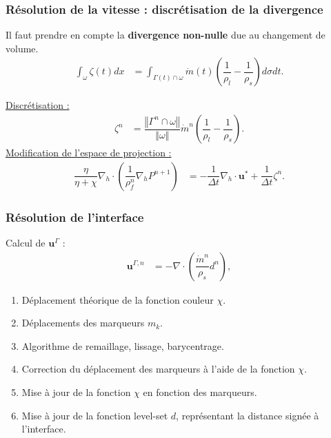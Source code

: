 \documentclass{beamer}
\newcommand{\inte}{\Gamma}
\newcommand{\vect}[1]{\bm{#1}}
\newcommand{\npl}{{n+1}}
\newcommand{\normeVec}[1]{\left\Vert #1\right\Vert}
\renewcommand{\frac}{\dfrac}
\begin{document}
\begin{frame}
    \frametitle{Résolution de la vitesse : discrétisation de la divergence}
    \footnotesize
        Il faut prendre en compte la \textbf{divergence non-nulle} due au changement de volume.\\
\begin{align}
	 \int_\omega \zeta (t) dx &= \int_{\inte (t) \cap \omega} \Dot{m}(t) \left( \frac{1}{\rho_l} - \frac{1}{\rho_s} \right) d\sigma dt.
\end{align}

\color{cea_rouge}\underline{Discrétisation :}\color{cea_texte}
\begin{align}
	\zeta^n &= \frac{\normeVec{\inte^n \cap \omega}}{\normeVec{\omega}}\Dot{m}^n \left( \frac{1}{\rho_l} - \frac{1}{\rho_s} \right).
\end{align}
\color{cea_rouge}\underline{Modification de l'espace de projection :}\color{cea_texte}
\begin{align}
	\label{eq:pression3}
	\frac{\eta}{\eta + \chi} \nabla_h \cdot \left( \frac{1}{\rho^n_f} \nabla_h P^\npl \right) &= -\frac{1}{\Delta t} \nabla_h \cdot \vect{u}^* + \frac{1}{\Delta t} \zeta^n.
\end{align}
\vspace{0.3cm}

\begin{center}
		\begin{tikzpicture}[scale = 0.55, every node/.style={scale=0.55}]
			
		\end{tikzpicture}
\end{center}
\end{frame}

\begin{frame}
    \frametitle{Résolution de l'interface}
    \footnotesize
Calcul de $\vect{u}^\inte$ :
\begin{align}
	\label{eq:interfaceVitesse}
	\vect{u}^{\inte,n} &=  - \nabla \cdot \left( \frac{\Dot{m}^n}{\rho_s}d^n \right),
\end{align}
\begin{enumerate}
	\item Déplacement théorique de la fonction couleur $\chi$.
	\item Déplacements des marqueurs $m_k$.
	\item Algorithme de remaillage, lissage, barycentrage.
	\item Correction du déplacement des marqueurs à l'aide de la fonction $\chi$.
	\item Mise à jour de la fonction $\chi$ en fonction des marqueurs.
	\item Mise à jour de la fonction level-set $d$, représentant la distance signée à l'interface.

\end{enumerate}
\end{frame}
\end{document}
